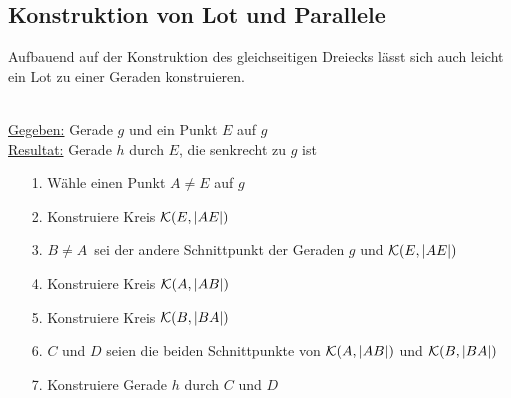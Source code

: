 




\subsection*{Konstruktion von Lot und Parallele}

Aufbauend auf der Konstruktion des gleichseitigen Dreiecks lässt sich
auch leicht ein Lot zu einer Geraden konstruieren.


\begin{konst}  
\phantom{Pups}\hspace*{1cm}\phantom{Pups}\\
\underline{Gegeben:} Gerade $g$ und ein Punkt $E$ auf $g$\\ 
\underline{Resultat:} Gerade $h$ durch $E$, die senkrecht zu $g$ ist 
\begin{enumerate}
\item[1.] Wähle einen Punkt $A\not=E$ auf $g$
\item[2.] Konstruiere Kreis ${\mathcal K}(E,|AE|)$
\item[3.] $B\not=A$~sei der andere Schnittpunkt der Geraden $g$ und ${\mathcal K}(E,|AE|)$
\item[4.] Konstruiere Kreis ${\mathcal K}(A,|AB|)$
\item[5.] Konstruiere Kreis ${\mathcal K}(B,|BA|)$
\item[6.] $C$ und $D$ seien die beiden Schnittpunkte von ${\mathcal K}(A,|AB|)$ und ${\mathcal K}(B,|BA|)$
\item[7.] Konstruiere Gerade $h$ durch $C$ und $D$
\end{enumerate}
\end{konst}



